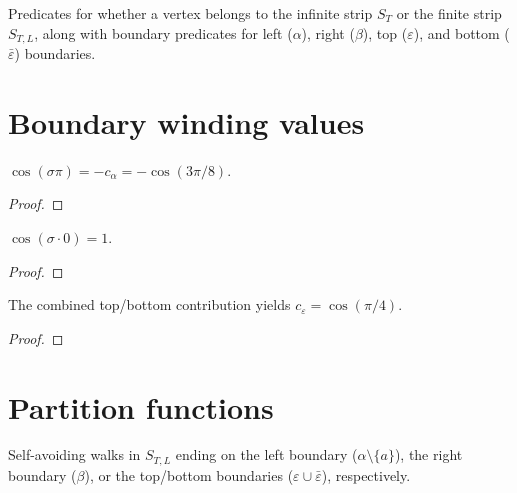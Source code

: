 \begin{definition}\label{def:finite_strip}
\leanok
{}
  Predicates for whether a vertex belongs to the infinite strip $S_T$ or
  the finite strip $S_{T,L}$, along with boundary predicates for
  left ($\alpha$), right ($\beta$), top ($\varepsilon$), and
  bottom ($\bar{\varepsilon}$) boundaries.
\end{definition}


\section{Boundary winding values}

\begin{lemma}\label{lem:left_coeff}
\leanok
{}
  $\cos(\sigma \pi) = -c_\alpha = -\cos(3\pi/8)$.
\end{lemma}
\begin{proof}
\leanok
\end{proof}

\begin{lemma}\label{lem:right_coeff}
\leanok
{}
  $\cos(\sigma \cdot 0) = 1$.
\end{lemma}
\begin{proof}
\leanok
\end{proof}

\begin{lemma}\label{lem:top_bottom_coeff}
\leanok
{}
  The combined top/bottom contribution yields $c_\varepsilon = \cos(\pi/4)$.
\end{lemma}
\begin{proof}
\leanok
\end{proof}


\section{Partition functions}

\begin{definition}\label{def:strip_saws}
\leanok
{}
  Self-avoiding walks in $S_{T,L}$ ending on the left boundary ($\alpha \setminus \{a\}$),
  the right boundary ($\beta$), or the top/bottom boundaries ($\varepsilon \cup \bar\varepsilon$),
  respectively.
\end{definition}

